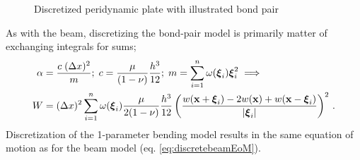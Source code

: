 %
\begin{figure}[h]
  \centering
{}
\caption{Discretized peridynamic plate with illustrated bond pair}
\label{fig:discretePlate}
\end{figure}
%
As with the beam, discretizing the bond-pair model is primarily matter of exchanging integrals for sums;
%
\begin{align}
\label{eq:discreteplate}
    \alpha &= \frac{c\; (\Delta x)^2}{m} ;\; c= \frac{\mu}{(1-\nu)}\frac{h^3}{12};\; m=\sum_{i=1}^n \omega(\boldsymbol{\xi}_i)\boldsymbol{\xi}_i^2 \implies  \\
    W&=(\Delta x)^2 \sum_{i=1}^n \omega(\boldsymbol{\xi}_i)\frac{\mu}{2(1-\nu)}\frac{h^3}{12}\left(\frac{w(\mathbf{x}+\boldsymbol{\xi}_i)-2w(\mathbf{x})+w(\mathbf{x}-\boldsymbol{\xi}_i)}{|\boldsymbol{\xi}_i|}\right)^2 \,.\notag
\end{align}
%
Discretization of the 1-parameter bending model results in the same equation of motion as for the beam model (eq. \ref{eq:discretebeamEoM}).
%
%

